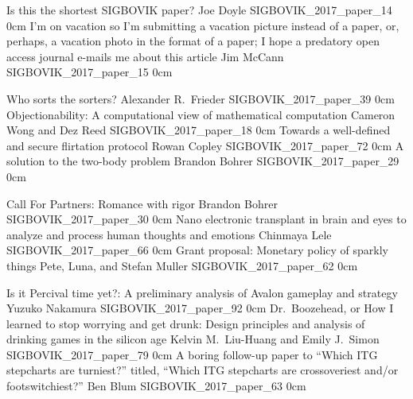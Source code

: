 

\addpaper
	{Is this the shortest SIGBOVIK paper?}
	{Joe Doyle}
	{}
	{SIGBOVIK_2017_paper_14}
	{0cm}
	{}
\addpaper
	{I'm on vacation so I'm submitting a vacation picture instead of a paper, or, perhaps, a vacation photo in the format of a paper; I hope a predatory open access journal e-mails me about this article}
	{Jim McCann}
	{}
	{SIGBOVIK_2017_paper_15}
	{0cm}
	{}

\addpaper
	{Who sorts the sorters?}
	{Alexander R.\ Frieder}
	{}
	{SIGBOVIK_2017_paper_39}
	{0cm}
	{}
\addpaper
	{Objectionability: A computational view of mathematical computation}
	{Cameron Wong and Dez Reed}
	{}
	{SIGBOVIK_2017_paper_18}
	{0cm}
	{}
\addpaper
	{Towards a well-defined and secure flirtation protocol}
	{Rowan Copley}
	{}
	{SIGBOVIK_2017_paper_72}
	{0cm}
	{}
\addpaper
	{A solution to the two-body problem}
	{Brandon Bohrer}
	{}
	{SIGBOVIK_2017_paper_29}
	{0cm}
	{}

\addpaper
	{Call For Partners: Romance with rigor}
	{Brandon Bohrer}
	{}
	{SIGBOVIK_2017_paper_30}
	{0cm}
	{}
\addpaper
	{Nano electronic transplant in brain and eyes to analyze and process human thoughts and emotions}
	{Chinmaya Lele}
	{}
	{SIGBOVIK_2017_paper_66}
	{0cm}
	{}
\addpaper
	{Grant proposal: Monetary policy of sparkly things}
	{Pete, Luna, and Stefan Muller}
	{}
	{SIGBOVIK_2017_paper_62}
	{0cm}
	{}

\addpaper
	{Is it Percival time yet?: A preliminary analysis of Avalon gameplay and strategy}
	{Yuzuko Nakamura}
	{}
	{SIGBOVIK_2017_paper_92}
	{0cm}
	{}
\addpaper
	{Dr.\ Boozehead, or How I learned to stop worrying and get drunk: Design principles and analysis of drinking games in the silicon age}
	{Kelvin M.\ Liu-Huang and Emily J.\ Simon}
	{}
	{SIGBOVIK_2017_paper_79}
	{0cm}
	{}
\addpaper
	{A boring follow-up paper to ``Which ITG stepcharts are turniest?'' titled, ``Which ITG stepcharts are crossoveriest and/or footswitchiest?''}
	{Ben Blum}
	{}
	{SIGBOVIK_2017_paper_63}
	{0cm}
	{}

